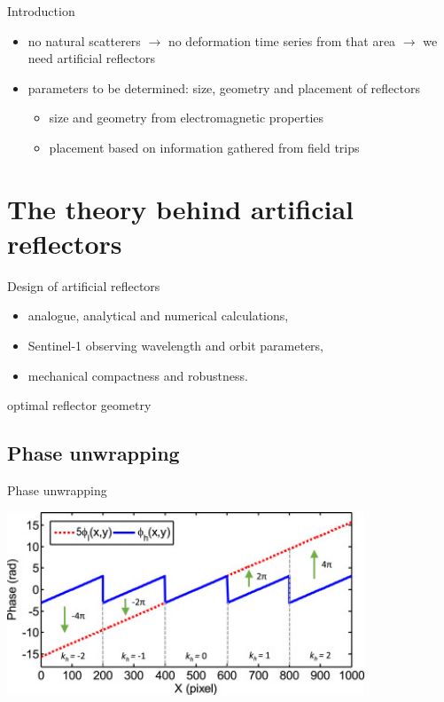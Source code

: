 \documentclass{beamer}
\begin{document}
\begin{frame}{Introduction}
    \begin{itemize}
    \large
        \item no natural scatterers $\rightarrow$ no deformation time series from that area $\rightarrow$ we need artificial reflectors
        \item parameters to be determined: size, geometry and placement of reflectors
            \begin{itemize}
            \large
                \item size and geometry from electromagnetic properties
                \item placement based on information gathered from field trips
            \end{itemize}
    \end{itemize}
    
\end{frame}


\section{The theory behind artificial reflectors}

\begin{frame}{Design of artificial reflectors}
    \begin{itemize}
        \item analogue, analytical and numerical calculations,
        \item Sentinel-1 observing wavelength and orbit parameters,
        \item mechanical compactness and robustness.
    \end{itemize}
    \begin{center}
        \resizebox{0.1\textwidth}{30pt}{$\Downarrow$}
        \vspace{10pt}
        
        optimal reflector geometry
    \end{center}
\end{frame}


\subsection{Phase unwrapping}

\begin{frame}{Phase unwrapping}
    \begin{center}
        \includegraphics[width=0.8\textwidth]{phase_unwrapping.jpg}
    \end{center}
\end{frame}
\end{document}

